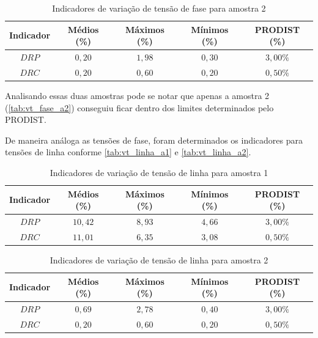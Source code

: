 \begin{table}[H]
  \centering
  \caption{Indicadores de variação de tensão de fase para amostra 2}
  \label{tab:vt_fase_a2}
  \begin{tabular}{@{}ccccc@{}}
    \toprule
    Indicador & Médios (\%) & Máximos (\%) & Mínimos (\%) & PRODIST (\%) \\
    \midrule
    $DRP$ & $0,20$ & $1,98$ & $0,30$ & $3,00\%$ \\
    $DRC$ & $0,20$ & $0,60$ & $0,20$ & $0,50\%$ \\
    \bottomrule
  \end{tabular}
\end{table}

Analisando essas duas amostras pode se notar que apenas a amostra 2 (\autoref{tab:vt_fase_a2}) conseguiu ficar dentro dos limites determinados pelo PRODIST.

De maneira análoga as tensões de fase, foram determinados os indicadores para tensões de linha conforme \autoref{tab:vt_linha_a1} e \autoref{tab:vt_linha_a2}.

\begin{table}[H]
  \centering
  \caption{Indicadores de variação de tensão de linha para amostra 1}
  \label{tab:vt_linha_a1}
  \begin{tabular}{@{}ccccc@{}}
    \toprule
    Indicador & Médios (\%) & Máximos (\%) & Mínimos (\%) & PRODIST (\%) \\
    \midrule
    $DRP$ & $10,42$ & $8,93$ & $4,66$ & $3,00\%$ \\
    $DRC$ & $11,01$ & $6,35$ & $3,08$ & $0,50\%$ \\
    \bottomrule
  \end{tabular}
\end{table}

\begin{table}[H]
  \centering
  \caption{Indicadores de variação de tensão de linha para amostra 2}
  \label{tab:vt_linha_a2}
  \begin{tabular}{@{}ccccc@{}}
    \toprule
    Indicador & Médios (\%) & Máximos (\%) & Mínimos (\%) & PRODIST (\%) \\
    \midrule
    $DRP$ & $0,69$ & $2,78$ & $0,40$ & $3,00\%$ \\
    $DRC$ & $0,20$ & $0,60$ & $0,20$ & $0,50\%$ \\
    \bottomrule
  \end{tabular}
\end{table}

